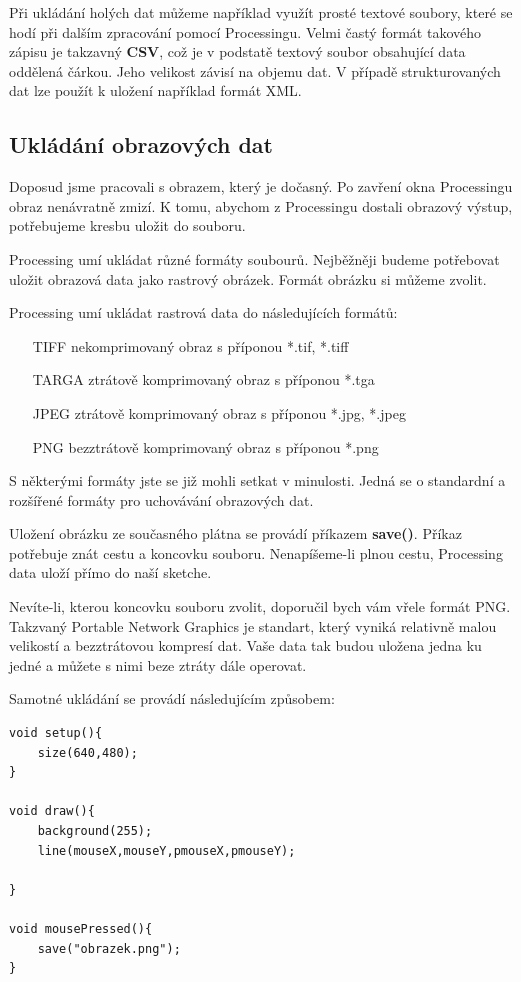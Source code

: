 \documentclass[10pt]{book}
\newcommand{\pododdil}[1]{\subsection{#1}\index{#1}\label{#1}}
\newcommand{\slovnik}[1]{\textbf{\gls{#1}}\index{#1}\label{#1}}
\begin{document}
Při ukládání holých dat můžeme například využít prosté textové soubory, které se hodí při dalším zpracování pomocí Processingu. Velmi častý formát takového zápisu je takzavný \slovnik{CSV}, což je v podstatě textový soubor obsahující data oddělená čárkou. Jeho velikost závisí na objemu dat. V případě strukturovaných dat lze použít k uložení například formát XML.


\pododdil{Ukládání obrazových dat}

Doposud jsme pracovali s obrazem, který je dočasný. Po zavření okna Processingu obraz nenávratně zmizí. K tomu, abychom z Processingu dostali obrazový výstup, potřebujeme kresbu uložit do souboru.

Processing umí ukládat různé formáty soubourů. Nejběžněji budeme potřebovat uložit obrazová data jako rastrový obrázek. Formát obrázku si můžeme zvolit.

Processing umí ukládat rastrová data do následujících formátů:


\begin{itemize}
\item[TIFF]
nekomprimovaný obraz s příponou *.tif, *.tiff
\item[TARGA]
ztrátově komprimovaný obraz s příponou *.tga
\item[JPEG]
ztrátově komprimovaný obraz s příponou *.jpg, *.jpeg
\item[PNG]
bezztrátově komprimovaný obraz s příponou *.png

\end{itemize}

S některými formáty jste se již mohli setkat v minulosti. Jedná se o standardní a rozšířené formáty pro uchovávání obrazových dat.

Uložení obrázku ze současného plátna se provádí příkazem \slovnik{save()}. Příkaz potřebuje znát cestu a koncovku souboru. Nenapíšeme-li plnou cestu, Processing data uloží přímo do naší sketche.

Nevíte-li, kterou koncovku souboru zvolit, doporučil bych vám vřele formát PNG. Takzvaný Portable Network Graphics je standart, který vyniká relativně malou velikostí a bezztrátovou kompresí dat. Vaše data tak budou uložena jedna ku jedné a můžete s nimi beze ztráty dále operovat. 

Samotné ukládání se provádí následujícím způsobem:

\begin{lstlisting} 
void setup(){
	size(640,480);
}

void draw(){
	background(255);
	line(mouseX,mouseY,pmouseX,pmouseY);

}

void mousePressed(){
	save("obrazek.png");
}

\end{lstlisting}
\end{document}

